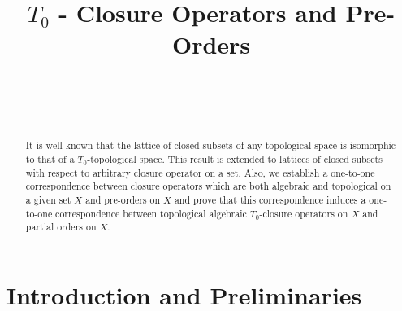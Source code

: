 \documentclass[
11pt,%
tightenlines,%
twoside,%
onecolumn,%
nofloats,%
nobibnotes,%
nofootinbib,%
superscriptaddress,%
noshowpacs,%
centertags]%
{revtex4}
\begin{document}

\title{$T_0$ - Closure Operators and Pre-Orders}

\author{~}
\author{~}
 




\begin{abstract}
It is well known that the lattice of closed  subsets of any
topological space is isomorphic to that of a $T_0$-topological
space.  This result is extended to lattices of closed subsets with
respect to arbitrary closure operator on a set. Also, we establish a
one-to-one correspondence between  closure operators which are both
algebraic and topological on a given set $X$  and pre-orders on $X$
and prove that this correspondence induces a one-to-one
correspondence between  topological algebraic $T_0$-closure
operators on $X$  and partial orders on $X.$
\end{abstract}

\maketitle

\section{Introduction and Preliminaries}
\end{document}
